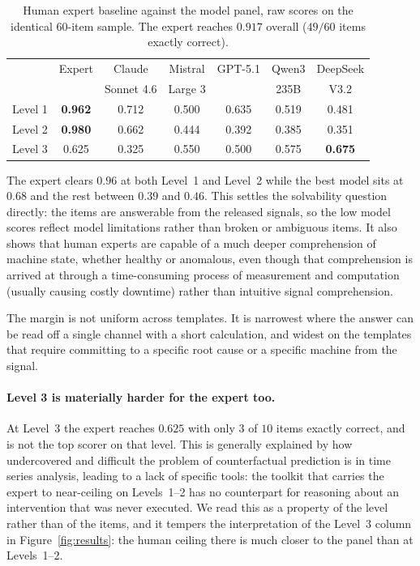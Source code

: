 \begin{table}[htbp]
    \centering
    \caption{Human expert baseline against the model panel, raw scores on the identical $60$-item sample. The expert reaches $0.917$ overall ($49/60$ items exactly correct).}
    \label{tab:human_baseline}
    \begin{tabular}{lcccccc}
        \toprule
         & Expert & Claude & Mistral & GPT-5.1 & Qwen3 & DeepSeek \\
         &        & Sonnet 4.6 & Large 3 &     & 235B  & V3.2 \\
        \midrule
        Level 1 & \textbf{0.962} & 0.712 & 0.500 & 0.635 & 0.519 & 0.481 \\
        Level 2 & \textbf{0.980} & 0.662 & 0.444 & 0.392 & 0.385 & 0.351 \\
        Level 3 & 0.625 & 0.325 & 0.550 & 0.500 & 0.575 & \textbf{0.675} \\
        \bottomrule
    \end{tabular}
\end{table}

The expert clears $0.96$ at both Level~1 and Level~2 while the best model sits at $0.68$ and the rest between $0.39$ and $0.46$. This settles the solvability question directly: the items are answerable from the released signals, so the low model scores reflect model limitations rather than broken or ambiguous items. It also shows that human experts are capable of a much deeper comprehension of machine state, whether healthy or anomalous, even though that comprehension is arrived at through a time-consuming process of measurement and computation (usually causing costly downtime) rather than intuitive signal comprehension.

The margin is not uniform across templates. It is narrowest where the answer can be read off a single channel with a short calculation, and widest on the templates that require committing to a specific root cause or a specific machine from the signal.

\paragraph{Level 3 is materially harder for the expert too.}
At Level~3 the expert reaches $0.625$ with only $3$ of $10$ items exactly correct, and is not the top scorer on that level. This is generally explained by how undercovered and difficult the problem of counterfactual prediction is in time series analysis, leading to a lack of specific tools: the toolkit that carries the expert to near-ceiling on Levels~1--2 has no counterpart for reasoning about an intervention that was never executed. We read this as a property of the level rather than of the items, and it tempers the interpretation of the Level~3 column in Figure~\ref{fig:results}: the human ceiling there is much closer to the panel than at Levels~1--2.

